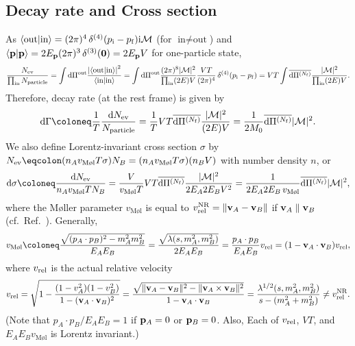\documentclass[CheatSheet]{subfiles}
\begin{document}
\subsection{Decay rate and Cross section}
As
$\braket{\text{out}|\text{in}}=(2\pi)^4\diracdelta[4](p\w i-p\w f)\ii\mathcal M$
(for $\text{in}\neq\text{out}$) and $\braket{\vc p|\vc p}=2E_{\vc p}(2\pi)^3\diracdelta[3](\vc 0)=2E_\vc {p}V$ for one-particle state,
\begin{equation}
 \frac{N\w{ev}}{\prod\w{in} N\w{particle}}
= \int\dd\Pi^{\mathrm{out}}\frac{\left|\braket{\text{out}|\text{in}}\right|^2}{\braket{\text{in}|\text{in}}}
= \int\dd\Pi^{\mathrm{out}}\frac{(2\pi)^8|\mathcal M|^2}{\prod\w{in}(2E)V}
\frac{VT}{(2\pi)^4}\diracdelta[4](p\w i-p\w f)
  = VT\int\overline{\dd\Pi^{(N\w f)}}\frac{|\mathcal M|^2}{\prod\w{in}(2E)V}.
\end{equation}
Therefore, decay rate (at the rest frame) is given by
\begin{equation}
 \dd\Gamma
\coloneq  \frac{1}{T}\frac{\dd N\w{ev}}{N\w{particle}}
 = \frac{1}{T}VT\overline{\dd\Pi^{(N\w f)}}\frac{|\mathcal M|^2}{(2E)V}
 = \frac{1}{2M_0}\overline{\dd\Pi^{(N\w f)}}{|\mathcal M|^2}.
\end{equation}
We also define Lorentz-invariant cross section $\sigma$ by $N\w{ev}\eqcolon(n_A v_{\text{M\o l}}T\sigma)N_B=(n_A v_{\text{M\o l}}T\sigma)(n_B V)$ with
number density $n$, or
\begin{equation}
\dd\sigma\coloneq \frac{\dd N\w{ev}}{n_A v_{\text{M\o l}}TN_B}
=
\frac{V}{v_{\text{M\o l}}T}
VT\overline{\dd\Pi^{(N\w f)}}\frac{|\mathcal M|^2}{2E_A2E_BV^2}
=
\frac{1}{2E_A2E_B\,v_{\text{M\o l}}}
\overline{\dd\Pi^{(N\w f)}}|\mathcal M|^2,
\end{equation}
where the M\o ller parameter $v_{\text{M\o l}}$ is equal to $v^{\mathrm{NR}}\w{rel}=\|\vc v_A-\vc v_B\|$ if ${\mathbf{v}}_A\parallel{\mathbf{v}}_B$ (cf.~Ref.~\cite{Cannoni:2016hro}).
Generally,
\begin{equation}
  v_{\text{M\o l}}\coloneq 
 \frac{\sqrt{(p_A\cdot p_B)^2-m_A^2m_B^2}}{E_AE_B}
=\frac{\sqrt{\Kallen(s,m_A^2,m_B^2)}}{2E_AE_B}
=\frac{p_A\cdot p_B}{E_A E_B}v\w{rel}
=({1-\vc v_A\cdot\vc v_B})v\w{rel},
\end{equation}
where $v\w{rel}$ is the actual relative velocity
\begin{equation}
  v\w{rel}
=\sqrt{1-\frac{(1-v_A^2)(1-v_B^2)}{1-(\vc v_A\cdot\vc v_B)^2}}
=\frac{\sqrt{\|\vc v_A-\vc v_B\|^2-\|\vc v_A\times\vc v_B\|^2}}{1-\vc v_A\cdot\vc v_B} =\frac{\Kallen[1/2](s,m_A^2,m_B^2)}{s-(m_A^2+m_B^2)}\neq v^{\mathrm{NR}}\w{rel}.
\end{equation}
(Note that $p_A\cdot p_B/E_AE_B=1$ if ${\mathbf{p}}_A=0$ or ${\mathbf{p}}_B=0$. Also, Each of $v\w{rel}$, $VT$, and $E_AE_Bv_{\text{M\o l}}$ is Lorentz invariant.)
\end{document}

